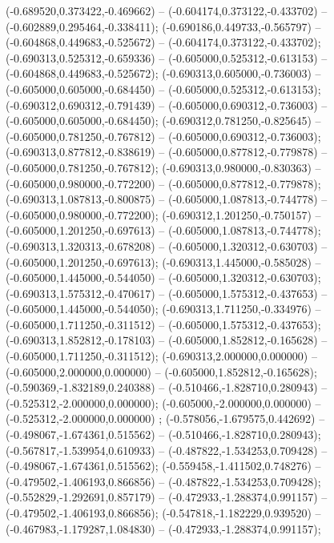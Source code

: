  (-0.689520,0.373422,-0.469662) -- (-0.604174,0.373122,-0.433702) -- (-0.602889,0.295464,-0.338411);
 (-0.690186,0.449733,-0.565797) -- (-0.604868,0.449683,-0.525672) -- (-0.604174,0.373122,-0.433702);
 (-0.690313,0.525312,-0.659336) -- (-0.605000,0.525312,-0.613153) -- (-0.604868,0.449683,-0.525672);
 (-0.690313,0.605000,-0.736003) -- (-0.605000,0.605000,-0.684450) -- (-0.605000,0.525312,-0.613153);
 (-0.690312,0.690312,-0.791439) -- (-0.605000,0.690312,-0.736003) -- (-0.605000,0.605000,-0.684450);
 (-0.690312,0.781250,-0.825645) -- (-0.605000,0.781250,-0.767812) -- (-0.605000,0.690312,-0.736003);
 (-0.690313,0.877812,-0.838619) -- (-0.605000,0.877812,-0.779878) -- (-0.605000,0.781250,-0.767812);
 (-0.690313,0.980000,-0.830363) -- (-0.605000,0.980000,-0.772200) -- (-0.605000,0.877812,-0.779878);
 (-0.690313,1.087813,-0.800875) -- (-0.605000,1.087813,-0.744778) -- (-0.605000,0.980000,-0.772200);
 (-0.690312,1.201250,-0.750157) -- (-0.605000,1.201250,-0.697613) -- (-0.605000,1.087813,-0.744778);
 (-0.690313,1.320313,-0.678208) -- (-0.605000,1.320312,-0.630703) -- (-0.605000,1.201250,-0.697613);
 (-0.690313,1.445000,-0.585028) -- (-0.605000,1.445000,-0.544050) -- (-0.605000,1.320312,-0.630703);
 (-0.690313,1.575312,-0.470617) -- (-0.605000,1.575312,-0.437653) -- (-0.605000,1.445000,-0.544050);
 (-0.690313,1.711250,-0.334976) -- (-0.605000,1.711250,-0.311512) -- (-0.605000,1.575312,-0.437653);
 (-0.690313,1.852812,-0.178103) -- (-0.605000,1.852812,-0.165628) -- (-0.605000,1.711250,-0.311512);
 (-0.690313,2.000000,0.000000) -- (-0.605000,2.000000,0.000000) -- (-0.605000,1.852812,-0.165628);
 (-0.590369,-1.832189,0.240388) -- (-0.510466,-1.828710,0.280943) -- (-0.525312,-2.000000,0.000000);
 (-0.605000,-2.000000,0.000000) -- (-0.525312,-2.000000,0.000000) ;
 (-0.578056,-1.679575,0.442692) -- (-0.498067,-1.674361,0.515562) -- (-0.510466,-1.828710,0.280943);
 (-0.567817,-1.539954,0.610933) -- (-0.487822,-1.534253,0.709428) -- (-0.498067,-1.674361,0.515562);
 (-0.559458,-1.411502,0.748276) -- (-0.479502,-1.406193,0.866856) -- (-0.487822,-1.534253,0.709428);
 (-0.552829,-1.292691,0.857179) -- (-0.472933,-1.288374,0.991157) -- (-0.479502,-1.406193,0.866856);
 (-0.547818,-1.182229,0.939520) -- (-0.467983,-1.179287,1.084830) -- (-0.472933,-1.288374,0.991157);
